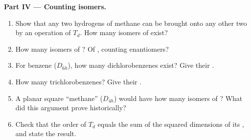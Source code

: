 \begin{problem}
\medskip\noindent\textbf{Part IV --- Counting isomers.}
\begin{enumerate}[resume]
  \item Show that any two hydrogens of methane can be brought onto any other
        two by an operation of $T_d$. How many isomers of  exist?
  \item How many isomers of ? Of , counting enantiomers?
  \item For benzene ($D_{6h}$), how many dichlorobenzenes exist? Give their
        .
  \item How many trichlorobenzenes? Give their .
  \item A planar square ``methane'' ($D_{4h}$) would have how many isomers of
        ? What did this argument prove historically?
  \item Check that the order of $T_d$ equals the sum of the squared dimensions
        of its , and state the result.
\end{enumerate}
\end{problem}
